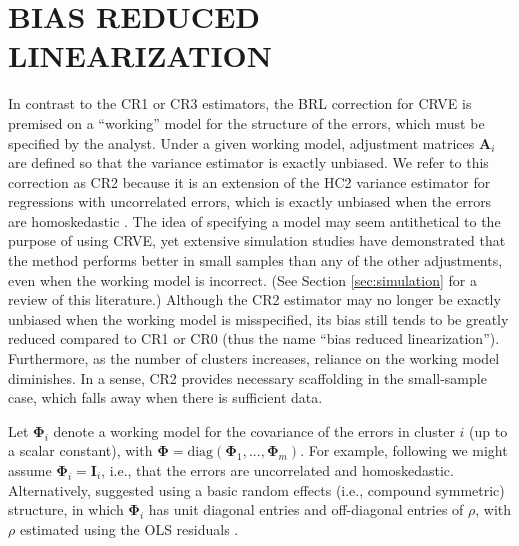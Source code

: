 \documentclass[12pt]{article}\usepackage[]{graphicx}\usepackage[]{color}
\newcommand{\bm}{\mathbf}
\newcommand{\bs}{\boldsymbol}
\begin{document}
\section{BIAS REDUCED LINEARIZATION}
\label{sec:BRL}

In contrast to the CR1 or CR3 estimators, the BRL correction for CRVE is premised on a ``working'' model for the structure of the errors, which must be specified by the analyst. 
Under a given working model, adjustment matrices $\bm{A}_i$ are defined so that the variance estimator is exactly unbiased.
We refer to this correction as CR2 because it is an extension of the HC2 variance estimator for regressions with uncorrelated errors, which is exactly unbiased when the errors are homoskedastic \citep{MacKinnon1985some}.
The idea of specifying a model may seem antithetical to the purpose of using CRVE, yet extensive simulation studies have demonstrated that the method performs better in small samples than any of the other adjustments, even when the working model is incorrect. (See Section \ref{sec:simulation} for a review of this literature.) 
Although the CR2 estimator may no longer be exactly unbiased when the working model is misspecified, its bias still tends to be greatly reduced compared to CR1 or CR0 (thus the name ``bias reduced linearization''). Furthermore, as the number of clusters increases, reliance on the working model diminishes. 
In a sense, CR2 provides necessary scaffolding in the small-sample case, which falls away when there is sufficient data.

Let $\bs\Phi_i$ denote a working model for the covariance of the errors in cluster $i$ (up to a scalar constant), with $\bs\Phi = \text{diag}\left(\bs\Phi_1,...,\bs\Phi_m\right)$. 
For example, following \citet{Bell2002bias} we might assume $\bs\Phi_i = \bm{I}_i$, i.e., that the errors are uncorrelated and homoskedastic. 
Alternatively, \citet{Imbens2015robust} suggested using a basic random effects (i.e., compound symmetric) structure, in which $\bs\Phi_i$ has unit diagonal entries and off-diagonal entries of $\rho$, with $\rho$ estimated using the OLS residuals \citep[see][p. 16]{Imbens2015robust}.
\end{document}
